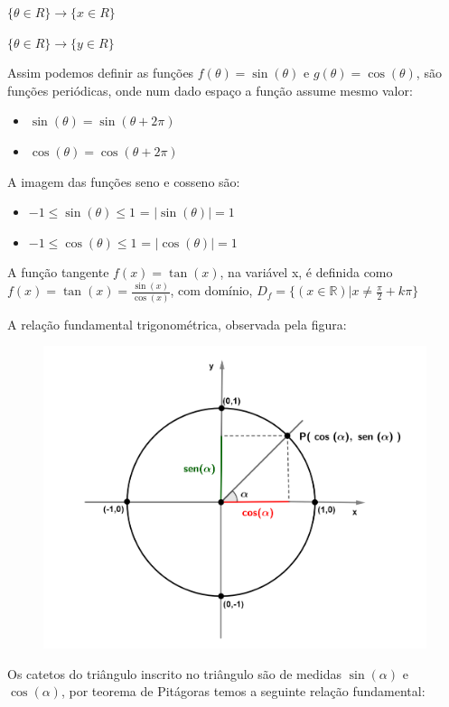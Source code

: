 \begin{multicols*}{2}
    $\{\theta \in R \} \rightarrow \{x \in R\}$

    $\{\theta \in R \} \rightarrow \{ y \in R\}$

    Assim podemos definir as funções $f(\theta) = \sin(\theta)$ e $g(\theta) = \cos(\theta)$, são funções periódicas, onde num dado espaço a função assume mesmo valor:
    \begin{itemize}
        \item $\sin(\theta) = \sin(\theta  + 2 \pi)$
        \item $\cos(\theta) = \cos(\theta +  2 \pi)$
    \end{itemize}

    A imagem das funções seno e cosseno são:
    \begin{itemize}
        \item $-1 \le \sin(\theta) \le 1$ = $|\sin(\theta)| = 1$
        \item $-1 \le \cos(\theta) \le 1$ = $|\cos(\theta)| = 1$
    \end{itemize}

    A função tangente $f(x)  = \tan(x)$, na variável x, é definida como
    $f(x) = \tan(x) = \frac{\sin(x)}{\cos(x)}$, com domínio,
    $D_f = \{ (x \in \mathbb{R})| x \ne \frac{\pi}{2} + k \pi \}$

    A relação fundamental trigonométrica, observada pela figura:
    \begin{figure}[H]
        \centering
        \includegraphics[scale=0.15]{assets/rafael/img32.png}
    \end{figure}
    Os catetos do triângulo inscrito no triângulo são de medidas $\sin(\alpha)$ e $\cos(\alpha)$, por teorema de Pitágoras temos a seguinte relação fundamental:


\end{multicols*}
